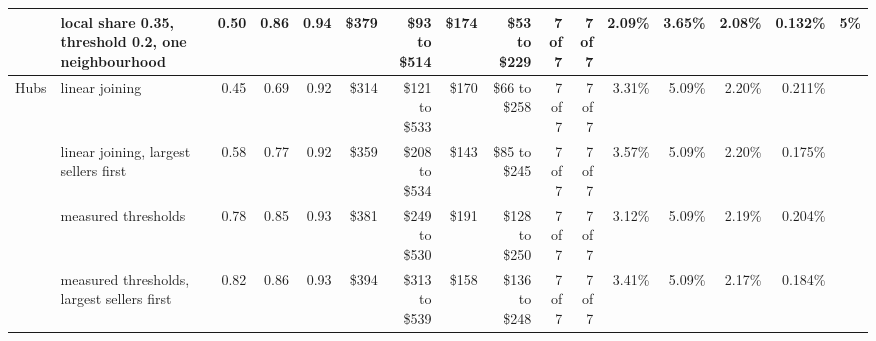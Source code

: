\begin{tabular}{llrrrrrrrrrrrrrr}
 & local share 0.35, threshold 0.2, one neighbourhood & 0.50 & 0.86 & 0.94 & \$379 & \$93 to \$514 & \$174 & \$53 to \$229 & 7 of 7 & 7 of 7 & 2.09\% & 3.65\% & 2.08\% & 0.132\% & 5\% \\
\midrule
Hubs & linear joining & 0.45 & 0.69 & 0.92 & \$314 & \$121 to \$533 & \$170 & \$66 to \$258 & 7 of 7 & 7 of 7 & 3.31\% & 5.09\% & 2.20\% & 0.211\% &  \\
 & linear joining, largest sellers first & 0.58 & 0.77 & 0.92 & \$359 & \$208 to \$534 & \$143 & \$85 to \$245 & 7 of 7 & 7 of 7 & 3.57\% & 5.09\% & 2.20\% & 0.175\% &  \\
 & measured thresholds & 0.78 & 0.85 & 0.93 & \$381 & \$249 to \$530 & \$191 & \$128 to \$250 & 7 of 7 & 7 of 7 & 3.12\% & 5.09\% & 2.19\% & 0.204\% &  \\
 & measured thresholds, largest sellers first & 0.82 & 0.86 & 0.93 & \$394 & \$313 to \$539 & \$158 & \$136 to \$248 & 7 of 7 & 7 of 7 & 3.41\% & 5.09\% & 2.17\% & 0.184\% &  \\
\bottomrule
\end{tabular}
